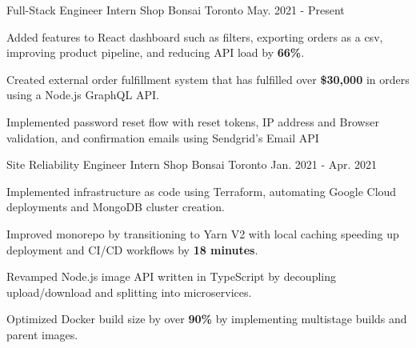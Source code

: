 

\begin{cventries}

  \cventry
    {Full-Stack Engineer Intern} %
    {Shop Bonsai} %
    {Toronto} %
    {May. 2021 - Present} %
    {
      \begin{cvitems} %
        \item {Added features to React dashboard such as filters, exporting orders as a csv, improving product pipeline, and reducing API load by \textbf{66\%}.}
        \item {Created external order fulfillment system that has fulfilled over \textbf{\$30,000} in orders using a Node.js GraphQL API.}
        \item {Implemented password reset flow with reset tokens, IP address and Browser validation, and confirmation emails using Sendgrid's Email API}
      \end{cvitems}
    }
    
  \cventry
    {Site Reliability Engineer Intern} %
    {Shop Bonsai} %
    {Toronto} %
    {Jan. 2021 - Apr. 2021} %
    {
      \begin{cvitems} %
        \item {Implemented infrastructure as code using Terraform, automating Google Cloud deployments and MongoDB cluster creation.}
        \item {Improved monorepo by transitioning to Yarn V2 with local caching speeding up deployment and CI/CD workflows by \textbf{18 minutes}.}
        \item {Revamped Node.js image API written in TypeScript by decoupling upload/download and splitting into microservices.}
        \item {Optimized Docker build size by over \textbf{90\%} by implementing multistage builds and parent images.}
      \end{cvitems}
    }
    
\end{cventries}
